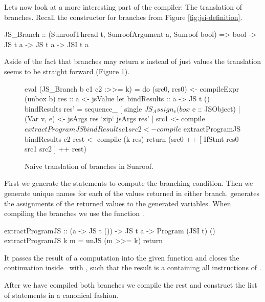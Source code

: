 
Lets now look at a more interesting part of the compiler: The translation of 
branches.
Recall the \JSI constructor for branches from Figure \ref{fig:jsi-definition}.
\begin{Code}
JS_Branch :: (SunroofThread t, SunroofArgument a, Sunroof bool) 
          => bool -> JS t a -> JS t a  -> JSI t a
\end{Code}
Aside of the fact that branches may return s
instead of just  values the translation seems to 
be straight forward (Figure \ref{fig:branch-translation}).
\begin{figure}[h]
\begin{Code}
eval (JS_Branch b c1 c2 :>>= k) = do
  (src0, res0) <- compileExpr (unbox b)
  res :: a <- jsValue
  let bindResults :: a -> JS t ()
      bindResults res' =
        sequence_ [ single $ JS_Assign_ v (box $ e :: JSObject)
                  | (Var v, e) <- jsArgs res `zip` jsArgs res' ]
  src1 <- compile $ extractProgramJS bindResults c1
  src2 <- compile $ extractProgramJS bindResults c2
  rest <- compile (k res)
  return (src0 ++ [ IfStmt res0 src1 src2 ] ++ rest)
\end{Code}
\caption{Naive translation of branches in Sunroof.}
\label{fig:branch-translation}
\end{figure}
First we generate the statements to compute the branching condition.
Then we generate unique names for each of the values returned in 
either branch.  generates the assignments of
the returned values to the generated variables. When compiling 
the branches we use the function .
\begin{Code}
extractProgramJS :: (a -> JS t ()) -> JS t a -> Program (JSI t) ()
extractProgramJS k m = unJS (m >>= k) return
\end{Code}
It passes the result of a computation  
into the given function  and
closes the continuation inside \JS~with ,
such that the result is a  containing
all instructions of .

After we have compiled both branches we compile the rest and
construct the list of statements in a canonical fashion.

